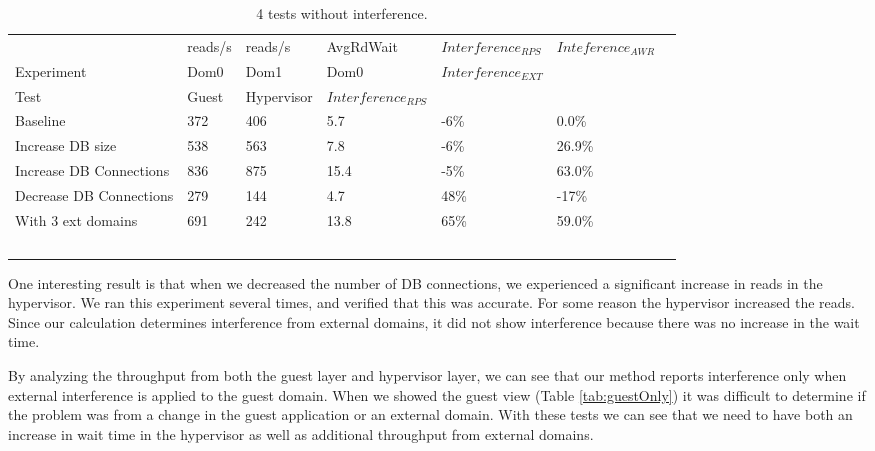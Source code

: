 \begin{table}[h]
\begin{tabular}{ l l l l l l p{9cm} }
                   & reads/s & reads/s & AvgRdWait & $Interference_{RPS}$ & $Inteference_{AWR}$ \\
	Experiment     & Dom0     & Dom1     & Dom0      & $Interference_{EXT}$ &             \\

    Test & Guest & Hypervisor  & $Interference_{RPS}$ \\
    \hline
    Baseline                   & 372 & 406 & 5.7 & -6\% & 0.0\%   \\  %
    Increase DB size           & 538 & 563 & 7.8 & -6\% & 26.9\% \\  %
    Increase DB Connections    & 836 & 875 &15.4 & -5\% & 63.0\% \\  %
	Decrease DB Connections    & 279 & 144 & 4.7 & 48\% & -17\%  \\  %
    With 3 ext domains         & 691 & 242 &13.8 & 65\% & 59.0\% \\  %
    \hline
  \end{tabular}
\caption{4 tests without interference. }
\label{tab:HypervisorGuest}
\end{table}
One interesting result is that when we decreased the number of DB connections, we experienced a significant increase in reads in the hypervisor.  We ran this experiment several times, and verified that this was accurate.  For some reason the hypervisor increased the reads.  Since our calculation determines interference from external domains, it did not show interference because there was no increase in the wait time.

By analyzing the throughput from both the guest layer and hypervisor layer, we can see that our method reports interference only when external interference is applied to the guest domain.  When we showed the guest view (Table \ref{tab:guestOnly}) it was difficult to determine if the problem was from a change in the guest application or an external domain.  With these tests we can see that we need to have both an increase in wait time in the hypervisor as well as additional throughput from external domains.


